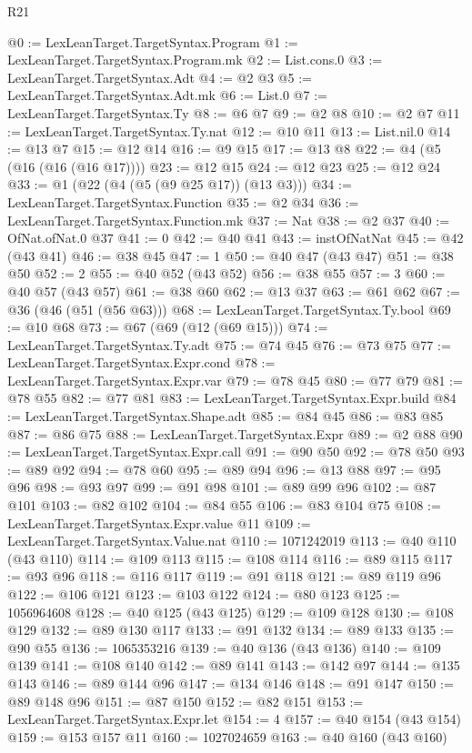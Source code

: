 \begin{lexlean}{R21}
\begin{coremodule}
@0 := LexLeanTarget.TargetSyntax.Program
@1 := LexLeanTarget.TargetSyntax.Program.mk
@2 := List.cons.{0}
@3 := LexLeanTarget.TargetSyntax.Adt
@4 := @2 @3
@5 := LexLeanTarget.TargetSyntax.Adt.mk
@6 := List.{0}
@7 := LexLeanTarget.TargetSyntax.Ty
@8 := @6 @7
@9 := @2 @8
@10 := @2 @7
@11 := LexLeanTarget.TargetSyntax.Ty.nat
@12 := @10 @11
@13 := List.nil.{0}
@14 := @13 @7
@15 := @12 @14
@16 := @9 @15
@17 := @13 @8
@22 := @4 (@5 (@16 (@16 (@16 @17))))
@23 := @12 @15
@24 := @12 @23
@25 := @12 @24
@33 := @1 (@22 (@4 (@5 (@9 @25 @17)) (@13 @3)))
@34 := LexLeanTarget.TargetSyntax.Function
@35 := @2 @34
@36 := LexLeanTarget.TargetSyntax.Function.mk
@37 := Nat
@38 := @2 @37
@40 := OfNat.ofNat.{0} @37
@41 := 0
@42 := @40 @41
@43 := instOfNatNat
@45 := @42 (@43 @41)
@46 := @38 @45
@47 := 1
@50 := @40 @47 (@43 @47)
@51 := @38 @50
@52 := 2
@55 := @40 @52 (@43 @52)
@56 := @38 @55
@57 := 3
@60 := @40 @57 (@43 @57)
@61 := @38 @60
@62 := @13 @37
@63 := @61 @62
@67 := @36 (@46 (@51 (@56 @63)))
@68 := LexLeanTarget.TargetSyntax.Ty.bool
@69 := @10 @68
@73 := @67 (@69 (@12 (@69 @15)))
@74 := LexLeanTarget.TargetSyntax.Ty.adt
@75 := @74 @45
@76 := @73 @75
@77 := LexLeanTarget.TargetSyntax.Expr.cond
@78 := LexLeanTarget.TargetSyntax.Expr.var
@79 := @78 @45
@80 := @77 @79
@81 := @78 @55
@82 := @77 @81
@83 := LexLeanTarget.TargetSyntax.Expr.build
@84 := LexLeanTarget.TargetSyntax.Shape.adt
@85 := @84 @45
@86 := @83 @85
@87 := @86 @75
@88 := LexLeanTarget.TargetSyntax.Expr
@89 := @2 @88
@90 := LexLeanTarget.TargetSyntax.Expr.call
@91 := @90 @50
@92 := @78 @50
@93 := @89 @92
@94 := @78 @60
@95 := @89 @94
@96 := @13 @88
@97 := @95 @96
@98 := @93 @97
@99 := @91 @98
@101 := @89 @99 @96
@102 := @87 @101
@103 := @82 @102
@104 := @84 @55
@106 := @83 @104 @75
@108 := LexLeanTarget.TargetSyntax.Expr.value @11
@109 := LexLeanTarget.TargetSyntax.Value.nat
@110 := 1071242019
@113 := @40 @110 (@43 @110)
@114 := @109 @113
@115 := @108 @114
@116 := @89 @115
@117 := @93 @96
@118 := @116 @117
@119 := @91 @118
@121 := @89 @119 @96
@122 := @106 @121
@123 := @103 @122
@124 := @80 @123
@125 := 1056964608
@128 := @40 @125 (@43 @125)
@129 := @109 @128
@130 := @108 @129
@132 := @89 @130 @117
@133 := @91 @132
@134 := @89 @133
@135 := @90 @55
@136 := 1065353216
@139 := @40 @136 (@43 @136)
@140 := @109 @139
@141 := @108 @140
@142 := @89 @141
@143 := @142 @97
@144 := @135 @143
@146 := @89 @144 @96
@147 := @134 @146
@148 := @91 @147
@150 := @89 @148 @96
@151 := @87 @150
@152 := @82 @151
@153 := LexLeanTarget.TargetSyntax.Expr.let
@154 := 4
@157 := @40 @154 (@43 @154)
@159 := @153 @157 @11
@160 := 1027024659
@163 := @40 @160 (@43 @160)

\end{coremodule}
\end{lexlean}
